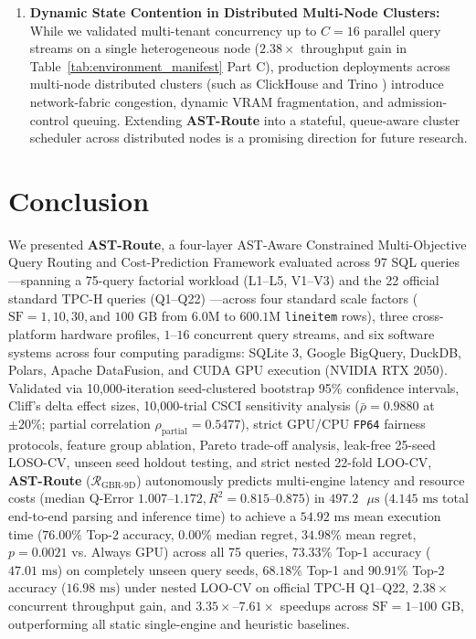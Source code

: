 \documentclass[10pt,a4paper]{article}
\begin{document}
\begin{enumerate}[leftmargin=1.5em,itemsep=2pt]
    \item \textbf{Dynamic State Contention in Distributed Multi-Node Clusters:} While we validated multi-tenant concurrency up to $C=16$ parallel query streams on a single heterogeneous node ($2.38\times$ throughput gain in Table~\ref{tab:environment_manifest} Part C), production deployments across multi-node distributed clusters (such as ClickHouse \cite{schulze2024clickhouse} and Trino \cite{sethi2019presto}) introduce network-fabric congestion, dynamic VRAM fragmentation, and admission-control queuing. Extending \textbf{AST-Route} into a stateful, queue-aware cluster scheduler across distributed nodes is a promising direction for future research.
\end{enumerate}

\section{Conclusion}
We presented \textbf{AST-Route}, a four-layer AST-Aware Constrained Multi-Objective Query Routing and Cost-Prediction Framework evaluated across 97 SQL queries---spanning a 75-query factorial workload (L1--L5, V1--V3) and the 22 official standard TPC-H queries (Q1--Q22) \cite{tpc2022tpch}---across four standard scale factors ($\text{SF}=1, 10, 30, \text{and } 100\text{ GB}$ from $6.0\text{M}$ to $600.1\text{M}$ \texttt{lineitem} rows), three cross-platform hardware profiles, $1\text{--}16$ concurrent query streams, and six software systems across four computing paradigms: SQLite 3, Google BigQuery, DuckDB, Polars, Apache DataFusion, and CUDA GPU execution (NVIDIA RTX 2050). Validated via 10,000-iteration seed-clustered bootstrap 95\% confidence intervals, Cliff's delta effect sizes, 10,000-trial CSCI sensitivity analysis ($\bar{\rho}=0.9880$ at $\pm 20\%$; partial correlation $\rho_{\text{partial}}=0.5477$), strict GPU/CPU \texttt{FP64} fairness protocols, feature group ablation, Pareto trade-off analysis, leak-free 25-seed LOSO-CV, unseen seed holdout testing, and strict nested 22-fold LOO-CV, \textbf{AST-Route} ($\mathcal{R}_{\text{GBR-9D}}$) autonomously predicts multi-engine latency and resource costs (median Q-Error $1.007\text{--}1.172, R^2 = 0.815\text{--}0.875$) in $497.2\text{ }\mu\text{s}$ ($4.145\text{ ms}$ total end-to-end parsing and inference time) to achieve a $54.92\text{ ms}$ mean execution time ($76.00\%$ Top-2 accuracy, $0.00\%$ median regret, $34.98\%$ mean regret, $p=0.0021$ vs. Always GPU) across all 75 queries, $73.33\%$ Top-1 accuracy ($47.01\text{ ms}$) on completely unseen query seeds, $68.18\%$ Top-1 and $90.91\%$ Top-2 accuracy ($16.98\text{ ms}$) under nested LOO-CV on official TPC-H Q1--Q22, $2.38\times$ concurrent throughput gain, and $3.35\times\text{--}7.61\times$ speedups across $\text{SF}=1\text{--}100\text{ GB}$, outperforming all static single-engine and heuristic baselines.
\end{document}
